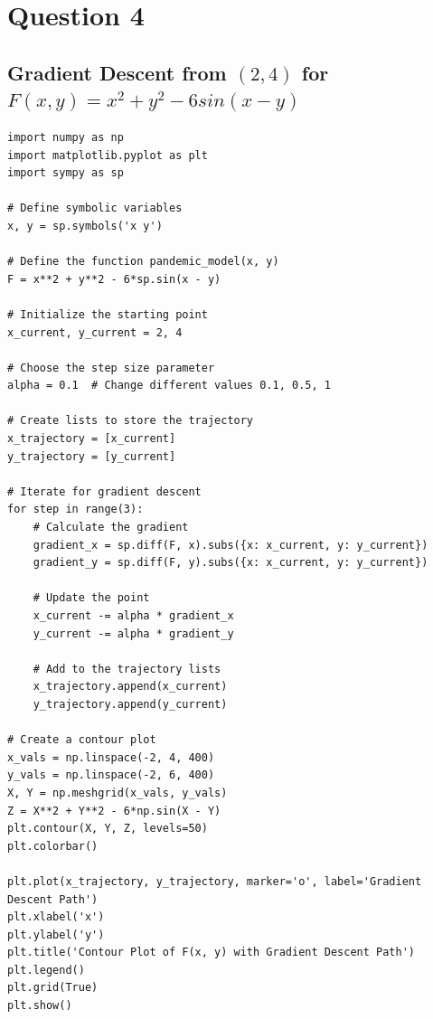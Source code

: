 \section{Question 4}
% 
% 
\subsection{Gradient Descent from $(2, 4)$ for $F(x, y) = x^2 + y^2 - 6sin(x - y)$}
% 
% 
% 
\begin{lstlisting}[style=pystyle]
import numpy as np
import matplotlib.pyplot as plt
import sympy as sp

# Define symbolic variables
x, y = sp.symbols('x y')

# Define the function pandemic_model(x, y)
F = x**2 + y**2 - 6*sp.sin(x - y)

# Initialize the starting point
x_current, y_current = 2, 4

# Choose the step size parameter
alpha = 0.1  # Change different values 0.1, 0.5, 1

# Create lists to store the trajectory
x_trajectory = [x_current]
y_trajectory = [y_current]

# Iterate for gradient descent
for step in range(3):
    # Calculate the gradient
    gradient_x = sp.diff(F, x).subs({x: x_current, y: y_current})
    gradient_y = sp.diff(F, y).subs({x: x_current, y: y_current})

    # Update the point
    x_current -= alpha * gradient_x
    y_current -= alpha * gradient_y

    # Add to the trajectory lists
    x_trajectory.append(x_current)
    y_trajectory.append(y_current)

# Create a contour plot
x_vals = np.linspace(-2, 4, 400)
y_vals = np.linspace(-2, 6, 400)
X, Y = np.meshgrid(x_vals, y_vals)
Z = X**2 + Y**2 - 6*np.sin(X - Y)
plt.contour(X, Y, Z, levels=50)
plt.colorbar()

plt.plot(x_trajectory, y_trajectory, marker='o', label='Gradient Descent Path')
plt.xlabel('x')
plt.ylabel('y')
plt.title('Contour Plot of F(x, y) with Gradient Descent Path')
plt.legend()
plt.grid(True)
plt.show()
\end{lstlisting}
% 
% 

